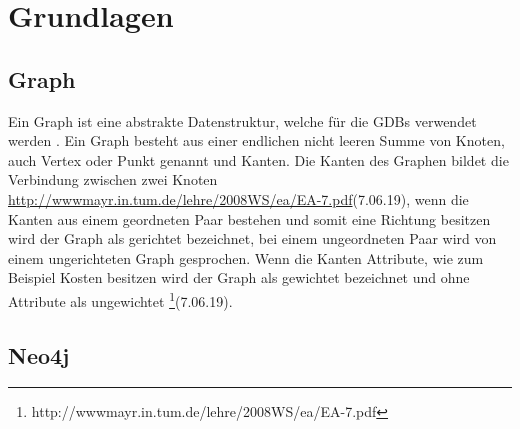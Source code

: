 
\chapter{Grundlagen} %

\label{Kaptiel 2} %

\section{Graph}

Ein Graph ist eine abstrakte Datenstruktur, welche für die GDBs verwendet werden \parencite{vicknair2010comparison}. Ein Graph besteht aus einer endlichen nicht leeren Summe von Knoten, auch Vertex oder Punkt genannt und Kanten. Die Kanten des Graphen bildet die Verbindung zwischen zwei Knoten \url{ http://wwwmayr.in.tum.de/lehre/2008WS/ea/EA-7.pdf}(7.06.19), wenn die Kanten aus einem geordneten Paar bestehen und somit eine Richtung besitzen wird der Graph als gerichtet bezeichnet, bei einem ungeordneten Paar wird von einem ungerichteten Graph gesprochen\parencite{bondy1976graph}. Wenn die Kanten Attribute, wie zum Beispiel Kosten besitzen wird der Graph als gewichtet bezeichnet und ohne Attribute als ungewichtet  \footnote{ http://wwwmayr.in.tum.de/lehre/2008WS/ea/EA-7.pdf}(7.06.19). 

\section{Neo4j}


